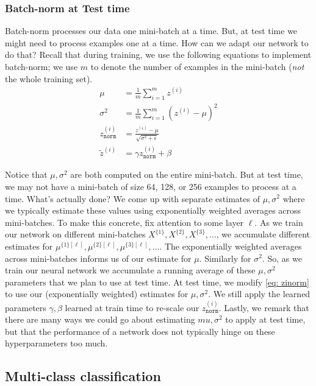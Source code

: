 \documentclass[12pt]{article}
\begin{document}
\subsubsection{Batch-norm at Test time} Batch-norm processes our data one mini-batch at a time. But, at test time
we might need to process examples one at a time. How can we adapt our network to do that? Recall that during training,
we use the following equations to implement batch-norm; we use $m$ to denote the number of examples in the mini-batch (\emph{not} the whole training set).
\begin{align}   \mu &= \frac{1}{m}\sum_{i=1}^m z^{(i)} \nonumber \\
  \sigma^2 &= \frac{1}{m} \sum_{i=1}^m \left(z^{(i)} - \mu\right)^2 \nonumber \\
  \label{eq: zinorm}
  z^{(i)}_{\texttt{norm}} &= \frac{z^{(i)} - \mu}{\sqrt{\sigma^2 + \epsilon}} \\
  \tilde z^{(i)} &= \gamma z^{(i)}_{\texttt{norm}} + \beta \nonumber \end{align}

Notice that $\mu, \sigma^2$ are both computed on the entire mini-batch. But at test time, we may not have a mini-batch
of size 64, 128, or 256 examples to process at a time. What's actually done? We come up with separate estimates of
$\mu, \sigma^2$ where we typically estimate these values using exponentially weighted averages across mini-batches.
To make this concrete, fix attention to some layer $\ell$. As we train our network on different mini-batches $X^{\{1\}}, X^{\{2\}}, X^{\{3\}}, \ldots$, we accumulate different estimates for $\mu^{\{1\}[\ell]}, \mu^{\{2\}[\ell]}, \mu^{\{3\}[\ell]}, \ldots$. The exponentially weighted averages across mini-batches informs us of our estimate for $\mu$. Similarly for $\sigma^2$. So, as we train our neural network we accumulate a running average of these $\mu, \sigma^2$ parameters that we plan to use at test time. At test time, we modify \ref{eq: zinorm} to use our (exponentially weighted) estimates for 
$\mu, \sigma^2$. We still apply the learned parameters $\gamma, \beta$ learned at train time to re-scale our $z^{(i)}_{\texttt{norm}}$. Lastly, we remark that there are many ways we could go about estimating $mu, \sigma^2$ to apply at test time, but that the performance of a network does not typically hinge on these hyperparameters too much.

\subsection{Multi-class classification} 
\end{document}
